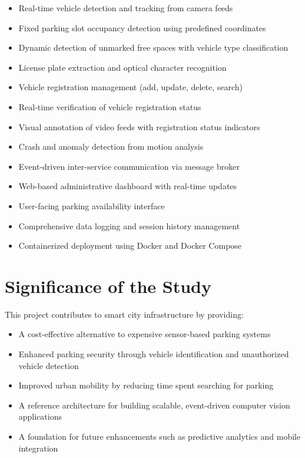 \documentclass[12pt,a4paper]{report}
\begin{document}
\begin{itemize}
    \item Real-time vehicle detection and tracking from camera feeds
    \item Fixed parking slot occupancy detection using predefined coordinates
    \item Dynamic detection of unmarked free spaces with vehicle type classification
    \item License plate extraction and optical character recognition
    \item Vehicle registration management (add, update, delete, search)
    \item Real-time verification of vehicle registration status
    \item Visual annotation of video feeds with registration status indicators
    \item Crash and anomaly detection from motion analysis
    \item Event-driven inter-service communication via message broker
    \item Web-based administrative dashboard with real-time updates
    \item User-facing parking availability interface
    \item Comprehensive data logging and session history management
    \item Containerized deployment using Docker and Docker Compose
\end{itemize}

\section{Significance of the Study}

This project contributes to smart city infrastructure by providing:

\begin{itemize}
    \item A cost-effective alternative to expensive sensor-based parking systems
    \item Enhanced parking security through vehicle identification and unauthorized vehicle detection
    \item Improved urban mobility by reducing time spent searching for parking
    \item A reference architecture for building scalable, event-driven computer vision applications
    \item A foundation for future enhancements such as predictive analytics and mobile integration
\end{itemize}
\end{document}
